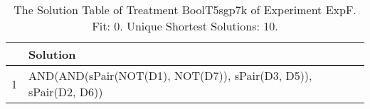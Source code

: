 \begin{table}[ht]
\centering
\begin{tabular}{rp{9cm}}
  \hline
 & Solution \\ 
  \hline
1 & AND(AND(sPair(NOT(D1), NOT(D7)), sPair(D3, D5)), sPair(D2, D6)) \\ 
   \hline
\end{tabular}
\caption{The Solution Table of Treatment BoolT5sgp7k of Experiment ExpF. Fit: 0. Unique Shortest Solutions: 10.} 
\end{table}

